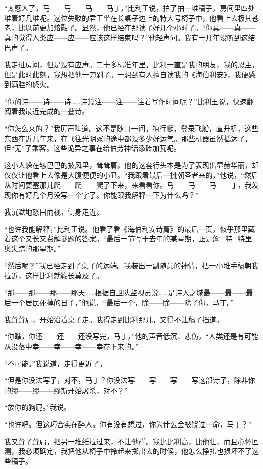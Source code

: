 \documentclass[AutoFakeBold=true]{book}
\begin{document}
``太感人了，马——马——马——马丁，''比利王说，拍了拍一堆稿子，房间里四处堆着好几堆呢。这位失败的君王坐在长桌子边上的特大号椅子中，他看上去极其苍老，比以前更加熔融了。显然，他已经在那读了好几个小时了。``你真——真——真的觉得人类应——应——应该这样结束吗？''他轻声问。我有十几年没听到这结巴声了。

我走进房间，但是没有应声。二十多标准年里，比利一直是我的朋友，我的恩主，但是此时此刻，我想把他一刀剁了。一想到有人擅自读我的《海伯利安》，我便感到满腔的怒火。

``你的诗——诗——诗……诗篇注——注——注着写作时间呢？''比利王说，快速翻阅着我最近完成的一叠诗。

``你怎么来的？''我厉声叫道。这不是随口一问。掠行艇，登录飞船，直升机，这些东西在近几年来，在飞往光阴冢的途中都没多少好运气。那些机器虽然抵达了，但``无''了乘客。这些诡异之事在给伯劳神话添砖加瓦呢。

这小人躲在皱巴巴的披风里，耸耸肩。他的这套行头本是为了表现出显赫华丽，却仅仅让他看上去像是大腹便便的小丑。``我跟着最后一批朝圣者来的，''他说，``然后从时间要塞那儿爬——爬——爬了下来，来看看你。马——马——马——丁，我发现你有好几个月没写一个字了。你能跟我解释一下为什么吗？''

我沉默地怒目而视，侧身走近。

``也许我能解释，''比利王说。他看了看《海伯利安诗篇》的最后一页，似乎那里藏着这个又长又费解谜题的答案。``最后一节写于去年的某星期，正是詹·特·特里奥失踪的那星期。''

``然后呢？''我已经走到了桌子的远端。我装出一副随意的神情，把一小堆手稿朝我拉近，这样比利就鞭长莫及了。

``那——那——那——那天……根据自卫队监视员说……是诗人之城最——最——最后一个居民死掉的日子，''他说，``最后一个，除——除——除了你，马丁。''

我耸耸肩，开始沿着桌子走。我得走到比利那儿，又得不让稿子挡道。

``你瞧，你还——还——还没写完，马丁，''他的声音低沉、悲伤，``人类还是有可能从没落中幸——幸——幸——幸存下来的。''

``不可能。''我说道，走得更近了。

``但是你没法写了，对不，马丁？你没法写——写——写——写这部诗了，除非你的缪——缪——缪斯开始屠杀，对不？''

``放你的狗屁。''我说。

``也许吧。但这巧合实在醉人。你有没有想过，你为什么会被饶过一命，马丁？''

我又耸了耸肩，把另一堆纸拉过来，不让他碰。我比比利高，比他壮，而且心怀叵测，我必须确定，我把他从椅子中拎起来掷出去的时候，他怎么挣扎也损坏不了这些稿子。
\end{document}
